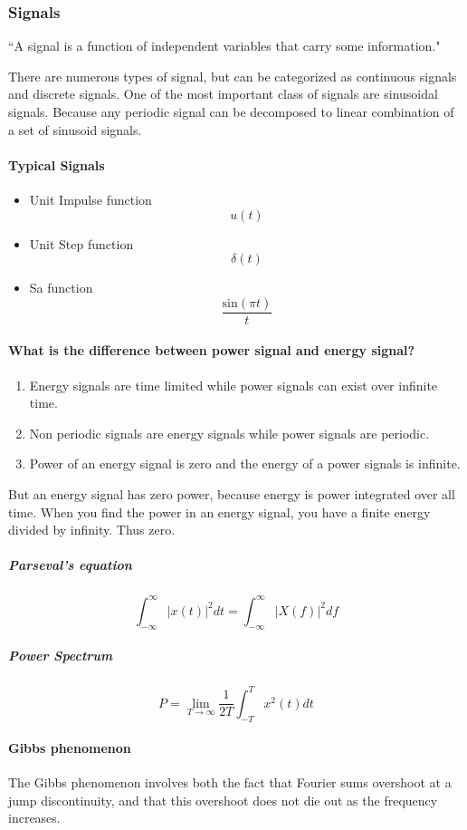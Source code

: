 \subsubsection{Signals}
 ``A signal is a function of independent variables that carry some information."

There are numerous types of signal, but can be categorized as continuous signals and discrete signals. One of the most important class of signals are sinusoidal signals. Because any periodic signal can be decomposed to linear combination of a set of sinusoid signals.

\paragraph{Typical Signals}
\begin{itemize}
  \item Unit Impulse function
  $$u(t)$$
  \item Unit Step function
  $$\delta(t)$$
  \item Sa function
  $$\frac{\textrm{sin}(\pi t)}{t}$$
\end{itemize}

\paragraph{What is the difference between power signal and energy signal?}
\begin{enumerate}
  \item Energy signals are time limited while power signals can exist over infinite time.
  \item Non periodic signals are energy signals while power signals are periodic.
  \item Power of an energy signal is zero and the energy of a power signals is infinite.
\end{enumerate}
But an energy signal has zero power, because energy is power integrated over all time. When you find the power in an energy signal, you have a finite energy divided by infinity. Thus zero.

\subparagraph{Parseval’s equation}
$$\int_{-\infty}^{\infty}|x(t)|^2dt=\int_{-\infty}^{\infty}|X(f)|^2df$$

\subparagraph{Power Spectrum}
$$P=\lim_{T\to \infty}\frac{1}{2T}\int_{-T}^{T}x^2(t)dt$$

\paragraph{Gibbs phenomenon}
The Gibbs phenomenon involves both the fact that Fourier sums overshoot at a jump discontinuity, and that this overshoot does not die out as the frequency increases.

